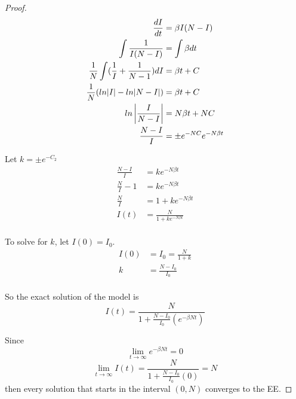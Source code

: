 \begin{proof}
      	\begin{align*}
      		\frac{dI}{dt}                                   &= \beta I(N-I)\\
      		\int\frac{1}{I(N-I)}                            &= \int\beta dt\\
      		\frac{1}{N}\int (\frac{1}{I} + \frac{1}{N-1})dI &= \beta t + C\\
      		\frac{1}{N}(ln|I|- ln|N-I|)                     &= \beta t + C\\
      		ln\left|\frac{I}{N-I}\right|                           &= N \beta t + NC\\
      		\frac{N-I}{I}                                   &= \pm e^{-NC}e^{-N\beta t}\\	
      	\end{align*}
           	
      	Let $k = \pm e^{-C_2}$\\
      	\begin{align*}
      		\frac{N-I}{I} 	  &= ke^{-N\beta t}\\
      		\frac{N}{I} - 1   &= ke^{-N\beta t}\\
      		\frac{N}{I} 	    &= 1 + ke^{-N\beta t}\\
      		I(t) 			        &= \frac{N}{1 + ke^{-N\beta t}}\\
      	\end{align*}
      	
      	To solve for $k$, let $I(0) = I_0$.\\
      	\begin{align*}
      		I(0) 	&= I_0 = \frac{N}{1 + k}\\ 
      		k 		&= \frac{N - I_0}{I_0}\\
      	\end{align*}
      	
        So the exact solution of the model is
        \begin{equation}
          I(t) =  \frac{N}{1+\frac{N-I_0}{I_0}(e^{-\beta N t})}
        \end{equation}
        
        Since 
        $$\lim_{t\to\infty} e^{-\beta N t} = 0$$
       $$\lim_{t\to\infty} I(t) = \frac{N}{1 +\frac{N-I_0}{I_0}(0)} = N$$
       then every solution that starts in the interval $(0, N)$ converges to the EE. 
      \end{proof}


